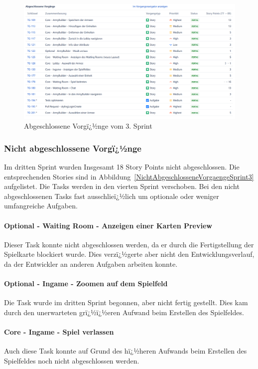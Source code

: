 \documentclass[12pt, titlepage]{scrartcl}
\newcommand{\Abb}[1]{%
	Abbildung\ \ref{#1}%
}
\begin{document}
		\begin{figure}[H] 
			\centering
			\includegraphics[width=1\textwidth]{Abschlossene_Vorgaenge_Sprint_3.png}
			\caption{Abgeschlossene Vorgï¿½nge vom 3. Sprint}
			\label{AbgeschlosseneVorgaengeSprint3}
		\end{figure}
	
		\subsubsection{Nicht abgeschlossene Vorgï¿½nge}
		Im dritten Sprint wurden Insgesamt 18 Story Points nicht abgeschlossen. Die entsprechenden Stories sind in \Abb{NichtAbgeschlosseneVorgaengeSprint3} aufgelistet. Die Tasks werden in den vierten Sprint verschoben. Bei den nicht abgeschlossenen Tasks fast ausschlieï¿½lich um optionale oder weniger umfangreiche Aufgaben.
			
			\paragraph{Optional - Waiting Room - Anzeigen einer Karten Preview}
			Dieser Task konnte nicht abgeschlossen werden, da er durch die Fertigstellung der Spielkarte blockiert wurde. Dies verzï¿½gerte aber nicht den Entwicklungsverlauf, da der Entwickler an anderen Aufgaben arbeiten konnte. 
			
			\paragraph{Optional - Ingame - Zoomen auf dem Spielfeld}
			Die Task wurde im dritten Sprint begonnen, aber nicht fertig gestellt. Dies kam durch den unerwarteten grï¿½ï¿½eren Aufwand beim Erstellen des Spielfeldes.
			
			\paragraph{Core - Ingame - Spiel verlassen}
			Auch diese Task konnte auf Grund des hï¿½heren Aufwands beim Erstellen des Spielfeldes noch nicht abgeschlossen werden. 
			
\end{document}
